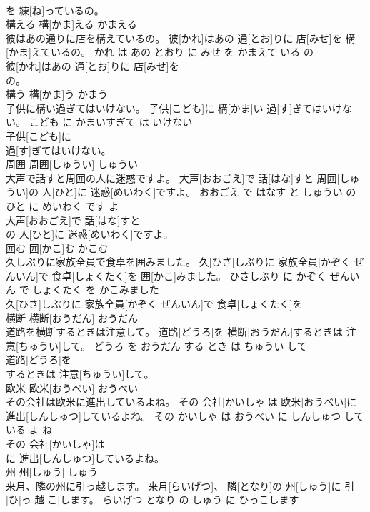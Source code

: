 \documentclass[8pt]{extreport}
\begin{document}
\begin{CJK}{UTF8}{min}
\\	を 練[ね]っているの。			
\\	構える	構[かま]える	かまえる	
\\	彼はあの通りに店を構えているの。	彼[かれ]はあの 通[とお]りに 店[みせ]を 構[かま]えているの。	かれ は あの とおり に みせ を かまえて いる の	
\\	彼[かれ]はあの 通[とお]りに 店[みせ]を
\\	の。			
\\	構う	構[かま]う	かまう	
\\	子供に構い過ぎてはいけない。	子供[こども]に 構[かま]い 過[す]ぎてはいけない。	こども に かまいすぎて は いけない	
\\	子供[こども]に
\\	過[す]ぎてはいけない。			
\\	周囲	周囲[しゅうい]	しゅうい	
\\	大声で話すと周囲の人に迷惑ですよ。	大声[おおごえ]で 話[はな]すと 周囲[しゅうい]の 人[ひと]に 迷惑[めいわく]ですよ。	おおごえ で はなす と しゅうい の ひと に めいわく です よ	
\\	大声[おおごえ]で 話[はな]すと
\\	の 人[ひと]に 迷惑[めいわく]ですよ。			
\\	囲む	囲[かこ]む	かこむ	
\\	久しぶりに家族全員で食卓を囲みました。	久[ひさ]しぶりに 家族全員[かぞく ぜんいん]で 食卓[しょくたく]を 囲[かこ]みました。	ひさしぶり に かぞく ぜんいん で しょくたく を かこみました	
\\	久[ひさ]しぶりに 家族全員[かぞく ぜんいん]で 食卓[しょくたく]を
\\	横断	横断[おうだん]	おうだん	
\\	道路を横断するときは注意して。	道路[どうろ]を 横断[おうだん]するときは 注意[ちゅうい]して。	どうろ を おうだん する とき は ちゅうい して	
\\	道路[どうろ]を
\\	するときは 注意[ちゅうい]して。			
\\	欧米	欧米[おうべい]	おうべい	
\\	その会社は欧米に進出しているよね。	その 会社[かいしゃ]は 欧米[おうべい]に 進出[しんしゅつ]しているよね。	その かいしゃ は おうべい に しんしゅつ して いる よ ね	
\\	その 会社[かいしゃ]は
\\	に 進出[しんしゅつ]しているよね。			
\\	州	州[しゅう]	しゅう	
\\	来月、隣の州に引っ越します。	来月[らいげつ]、 隣[となり]の 州[しゅう]に 引[ひ]っ 越[こ]します。	らいげつ となり の しゅう に ひっこします	

\end{CJK}
\end{document}
